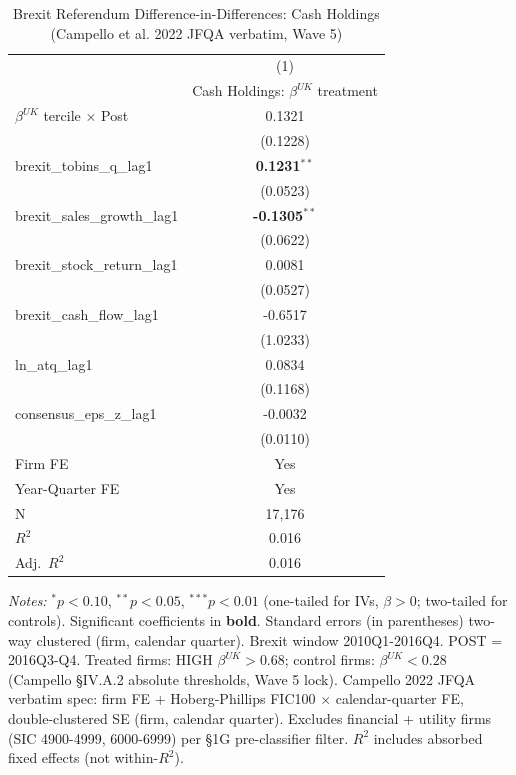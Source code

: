 \documentclass[11pt,a4paper]{article}
\begin{document}
\begin{table}[htbp]
\centering
\caption{Brexit Referendum Difference-in-Differences: Cash Holdings (Campello et al. 2022 JFQA verbatim, Wave 5)}
\label{tab:h1_5_brexit_did}
\scriptsize
\begin{tabular}{lc}
\toprule
 & (1) \\
 & Cash Holdings: $\beta^{UK}$ treatment \\
\midrule
$\beta^{UK}$ tercile $\times$ Post & 0.1321 \\
 & (0.1228) \\
\midrule
brexit\_tobins\_q\_lag1 & \textbf{0.1231}$^{**}$ \\
 & (0.0523) \\
brexit\_sales\_growth\_lag1 & \textbf{-0.1305}$^{**}$ \\
 & (0.0622) \\
brexit\_stock\_return\_lag1 & 0.0081 \\
 & (0.0527) \\
brexit\_cash\_flow\_lag1 & -0.6517 \\
 & (1.0233) \\
ln\_atq\_lag1 & 0.0834 \\
 & (0.1168) \\
consensus\_eps\_z\_lag1 & -0.0032 \\
 & (0.0110) \\
\midrule
Firm FE & Yes \\
Year-Quarter FE & Yes \\
\midrule
N & 17,176 \\
$R^2$ & 0.016 \\
Adj.~$R^2$ & 0.016 \\
\bottomrule
\end{tabular}
\begin{minipage}{\linewidth}
\vspace{2pt}\scriptsize
\textit{Notes:} $^{*}p<0.10$, $^{**}p<0.05$, $^{***}p<0.01$ (one-tailed for IVs, $\beta > 0$; two-tailed for controls).
 Significant coefficients in \textbf{bold}.
 Standard errors (in parentheses) two-way clustered (firm, calendar quarter).
 Brexit window 2010Q1-2016Q4. POST = 2016Q3-Q4. Treated firms: HIGH $\beta^{UK} > 0.68$; control firms: $\beta^{UK} < 0.28$ (Campello \S IV.A.2 absolute thresholds, Wave 5 lock). Campello 2022 JFQA verbatim spec: firm FE + Hoberg-Phillips FIC100 $\times$ calendar-quarter FE, double-clustered SE (firm, calendar quarter). Excludes financial + utility firms (SIC 4900-4999, 6000-6999) per \S 1G pre-classifier filter.
 $R^2$ includes absorbed fixed effects (not within-$R^2$).
\end{minipage}
\end{table}
\end{document}

